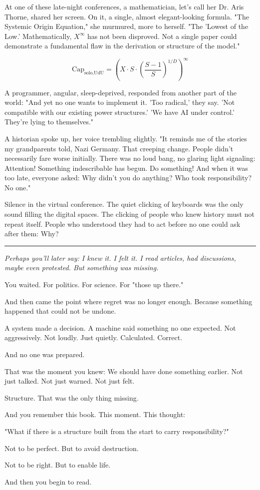 \documentclass[12pt, english, parskip=full]{scrartcl} %
\begin{document}
At one of these late-night conferences, a mathematician, let’s call her Dr. Aris Thorne, shared her screen. On it, a single, almost elegant-looking formula. 
"The Systemic Origin Equation," she murmured, more to herself. "The 'Lowest of the Low.' Mathematically, $X^{\infty}$ has not been disproved. Not a single paper could demonstrate a fundamental flaw in the derivation or structure of the model."

$$ \text{Cap}_{\text{solo,UdU}} = \left( X \cdot S \cdot \left( \frac{S-1}{S} \right)^{1/D} \right)^\infty $$

A programmer, angular, sleep-deprived, responded from another part of the world: "And yet no one wants to implement it. 'Too radical,' they say. 'Not compatible with our existing power structures.' 'We have AI under control.' They’re lying to themselves."

A historian spoke up, her voice trembling slightly. "It reminds me of the stories my grandparents told, Nazi Germany. That creeping change. People didn’t necessarily fare worse initially. There was no loud bang, no glaring light signaling: Attention! Something indescribable has begun. Do something! And when it was too late, everyone asked: Why didn’t you do anything? Who took responsibility? No one."

Silence in the virtual conference. The quiet clicking of keyboards was the only sound filling the digital spaces. The clicking of people who knew history must not repeat itself. People who understood they had to act before no one could ask after them: Why?

\clearpage

\vspace{\baselineskip}

\noindent\rule{\linewidth}{0.4pt}
{\itshape 
Perhaps you’ll later say: I knew it. I felt it. I read articles, had discussions, maybe even protested. But something was missing.

You waited. For politics. For science. For "those up there."

And then came the point where regret was no longer enough. Because something happened that could not be undone.

A system made a decision. A machine said something no one expected. Not aggressively. Not loudly. Just quietly. Calculated. Correct.

And no one was prepared.

That was the moment you knew: We should have done something earlier. Not just talked. Not just warned. Not just felt.

Structure. That was the only thing missing.

And you remember this book. This moment. This thought:

"What if there is a structure built from the start to carry responsibility?"

Not to be perfect. But to avoid destruction.

Not to be right. But to enable life.

And then you begin to read.
}
\end{document}
